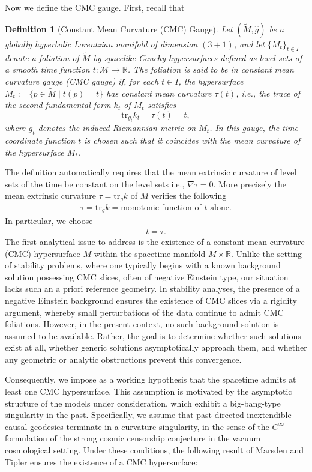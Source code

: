 \documentclass{amsart}
\newtheorem{definition}{Definition}
\newcommand{\tr}{\mbox{tr}}
\begin{document}
\noindent Now we define the CMC gauge. First, recall that  
\begin{definition}[Constant Mean Curvature (CMC) Gauge] Let \((\widetilde{M}, \widehat{g})\) be a globally hyperbolic Lorentzian manifold of dimension \( (3+1) \), and let \(\{M_t\}_{t \in I} \) denote a foliation of \(\widetilde{M}\) by spacelike Cauchy hypersurfaces defined as level sets of a smooth time function \(t: \mathcal{M} \to \mathbb{R}\). The foliation is said to be in \emph{constant mean curvature gauge} (CMC gauge) if, for each \(t \in I\), the hypersurface \(M_t := \{p \in \widetilde{M} \mid t(p) = t\}\) has constant mean curvature \(\tau(t)\), i.e., the trace of the second fundamental form \(k_t\) of \(M_t\) satisfies \[ \mathrm{tr}_{g_t} k_t = \tau(t) = t,\]
where $g_{t}$ denotes the induced Riemannian metric on $M_{t}$. In this gauge, the time coordinate function $t$ is chosen such that it coincides with the mean curvature of the hypersurface $M_{t}$.
\end{definition}
\noindent The definition automatically requires that the mean extrinsic curvature of level sets of the time be constant on the level sets i.e., $\nabla\tau=0$. More precisely the mean extrinsic curvature $\tau=\tr_{g}k$ of $M$ verifies the following 
\begin{align}
\label{eq:cmcg}
 \tau=\tr_{g}k=\text{monotonic function of $t$ alone}.  
\end{align}
In particular, we choose 
\begin{align}
    t=\tau.
\end{align}
The first analytical issue to address is the existence of a constant mean curvature (CMC) hypersurface $M$ within the spacetime manifold $M\times \mathbb{R}$. Unlike the setting of stability problems, where one typically begins with a known background solution possessing CMC slices, often of negative Einstein type, our situation lacks such an a priori reference geometry. In stability analyses, the presence of a negative Einstein background ensures the existence of CMC slices via a rigidity argument, whereby small perturbations of the data continue to admit CMC foliations. However, in the present context, no such background solution is assumed to be available. Rather, the goal is to determine whether such solutions exist at all, whether generic solutions asymptotically approach them, and whether any geometric or analytic obstructions prevent this convergence.

\noindent Consequently, we impose as a working hypothesis that the spacetime admits at least one CMC hypersurface. This assumption is motivated by the asymptotic structure of the models under consideration, which exhibit a big-bang-type singularity in the past. Specifically, we assume that past-directed inextendible causal geodesics terminate in a curvature singularity, in the sense of the $C^{\infty}$ formulation of the strong cosmic censorship conjecture in the vacuum cosmological setting. Under these conditions, the following result of Marsden and Tipler ensures the existence of a CMC hypersurface:
\end{document}
